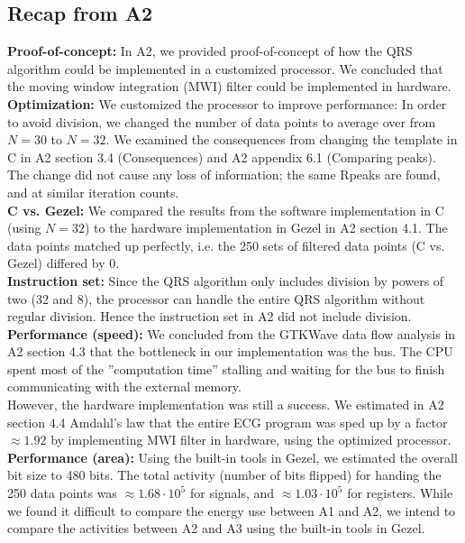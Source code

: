 \subsection{Recap from A2}

\textbf{Proof-of-concept:} In A2, we provided proof-of-concept of how the QRS algorithm could be implemented in a customized processor. We concluded that the moving window integration (MWI) filter could be implemented in hardware.\\

\textbf{Optimization:} We customized the processor to improve performance: In order to avoid division, we changed the number of data points to average over from $N = 30$ to $N = 32$. We examined the consequences from changing the template in C in A2 section 3.4 (Consequences) and A2 appendix 6.1 (Comparing peaks). The change did not cause any loss of information; the same Rpeaks are found, and at similar iteration counts.\\

\textbf{C vs. Gezel:} We compared the results from the software implementation in C (using $N=32$) to the hardware implementation in Gezel in A2 section 4.1. The data points matched up perfectly, i.e. the 250 sets of filtered data points (C vs. Gezel) differed by 0.\\

\textbf{Instruction set:} Since the QRS algorithm only includes division by powers of two (32 and 8), the processor can handle the entire QRS algorithm without regular division. Hence the instruction set in A2 did not include division.\\

\textbf{Performance (speed):} We concluded from the GTKWave data flow analysis in A2 section 4.3 that the bottleneck in our implementation was the bus. The CPU spent most of the ”computation time” stalling and waiting for the bus to finish communicating with the external memory. \\
However, the hardware implementation was still a success. We estimated in A2 section 4.4 Amdahl's law that the entire ECG program was sped up by a factor $\approx 1.92$ by implementing MWI filter in hardware, using the optimized processor.\\

\textbf{Performance (area):} Using the built-in tools in Gezel, we estimated the overall bit size to 480 bits. The total activity (number of bits flipped) for handing the 250 data points was $\approx 1.68 \cdot 10^5$ for signals, and $\approx 1.03 \cdot 10^5$ for registers. While we found it difficult to compare the energy use between A1 and A2, we intend to compare the activities between A2 and A3 using the built-in tools in Gezel.